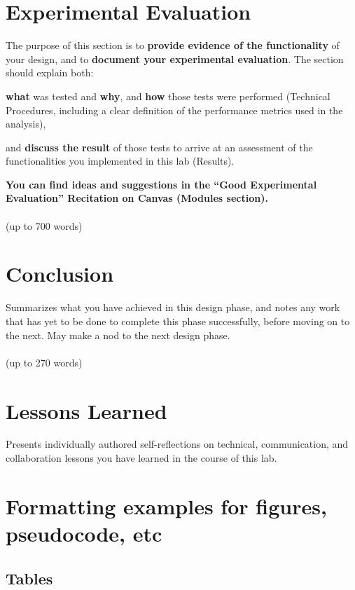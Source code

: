 \documentclass{article}
\begin{document}
\section{Experimental Evaluation}
The purpose of this section is to \textbf{provide evidence of the functionality} of your design, and to \textbf{document your experimental evaluation}. The section should explain both:

\begin{enumerate}
\begin{item}
\textbf{what} was tested and \textbf{why}, and \textbf{how} those tests were performed (Technical Procedures, including a clear definition of the performance metrics used in the analysis),
\end{item}
\begin{item}
and \textbf{discuss the result} of those tests to arrive at an assessment of the functionalities you implemented in this lab (Results).
\end{item}
\end{enumerate}

\textbf{You can find ideas and suggestions in the “Good Experimental Evaluation” Recitation on Canvas (Modules section).}\\\\
(up to 700 words)

\section{Conclusion}
Summarizes what you have achieved in this design phase, and notes any work that has yet to be done to complete this phase successfully, before moving on to the next. May make a nod to the next design phase.\\\\
(up to 270 words)

\section{Lessons Learned}
Presents individually authored self-reflections on technical, communication, and collaboration lessons you have learned in the course of this lab.

\section{Formatting examples for figures, pseudocode, etc}

\subsection{Tables}
\end{document}
